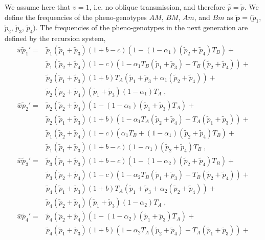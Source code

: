 \documentclass[12pt]{extarticle}
\let\vec\mathbf
\begin{document}
\begin{appendices}
We assume here that $v=1$, i.e. no oblique transmission, and therefore $\hat{p}=\tilde{p}$.
We define the frequencies of the pheno-genotypes $AM$, $BM$, $Am$, and $Bm$ as $\vec{\tilde{p}}= (\tilde{p}_1$, $\tilde{p}_2$, $\tilde{p}_3$, $\tilde{p}_4)$. 
The frequencies of the pheno-genotypes in the next generation are defined by the recursion system, 
\begin{equation} \label{eq:next_gen_p_1}
  \begin{aligned}
  \bar{w}\tilde{p}_1' = 
  & \tilde{p}_1(\tilde{p}_1+\tilde{p}_3)(1+b-c)(1 - (1-\alpha_1)(\tilde{p}_2 + \tilde{p}_4)T_B) + \\
  & \tilde{p}_1(\tilde{p}_2 + \tilde{p}_4)(1-c)(1-\alpha_1T_B(\tilde{p}_1 + \tilde{p}_3) - T_B(\tilde{p}_2 + \tilde{p}_4)) + \\
  & \tilde{p}_2(\tilde{p}_1 + \tilde{p}_3)(1+b)T_A(\tilde{p}_1 + \tilde{p}_3 + \alpha_1(\tilde{p}_2 + \tilde{p}_4)) + \\
  & \tilde{p}_2(\tilde{p}_2 + \tilde{p}_4)(\tilde{p}_1 + \tilde{p}_3)(1-\alpha_1)T_A \;,
\\
  \bar{w}\tilde{p}_2' = 
  & \tilde{p}_2(\tilde{p}_2+\tilde{p}_4)(1 - (1-\alpha_1)(\tilde{p}_1 + \tilde{p}_3)T_A) + \\
  & \tilde{p}_2(\tilde{p}_1 + \tilde{p}_3)(1+b)(1-\alpha_1 T_A(\tilde{p}_2 + \tilde{p}_4) - T_A(\tilde{p}_1 + \tilde{p}_3)) + \\
  & \tilde{p}_1(\tilde{p}_2 + \tilde{p}_4)(1-c)(\alpha_1 T_B + (1-\alpha_1)(\tilde{p}_2 + \tilde{p}_4)T_B) + \\
  & \tilde{p}_1(\tilde{p}_1 + \tilde{p}_3)(1+b-c)(1-\alpha_1)(\tilde{p}_2 + \tilde{p}_4)T_B \;, 
\\
  \bar{w}\tilde{p}_3' =
  & \tilde{p}_3(\tilde{p}_1+\tilde{p}_3)(1+b-c)(1 - (1-\alpha_2)(\tilde{p}_2 + \tilde{p}_4)T_B) + \\
  & \tilde{p}_3(\tilde{p}_2 + \tilde{p}_4)(1-c)(1-\alpha_2T_B(\tilde{p}_1 + \tilde{p}_3) - T_B(\tilde{p}_2 + \tilde{p}_4)) + \\
  & \tilde{p}_4(\tilde{p}_1 + \tilde{p}_3)(1+b)T_A(\tilde{p}_1 + \tilde{p}_3 + \alpha_2(\tilde{p}_2 + \tilde{p}_4)) + \\
  & \tilde{p}_4(\tilde{p}_2 + \tilde{p}_4)(\tilde{p}_1 + \tilde{p}_3)(1-\alpha_2)T_A \;, 
\\
  \bar{w}\tilde{p}_4' =
  & \tilde{p}_4(\tilde{p}_2 + \tilde{p}_4)(1 - (1-\alpha_2)(\tilde{p}_1 + \tilde{p}_3)T_A) + \\
  & \tilde{p}_4(\tilde{p}_1 + \tilde{p}_3)(1+b)(1-\alpha_2T_A(\tilde{p}_2 + \tilde{p}_4)-T_A(\tilde{p}_1 + \tilde{p}_3)) + \\

\end{aligned}
\end{equation}
\end{appendices}
\end{document}

